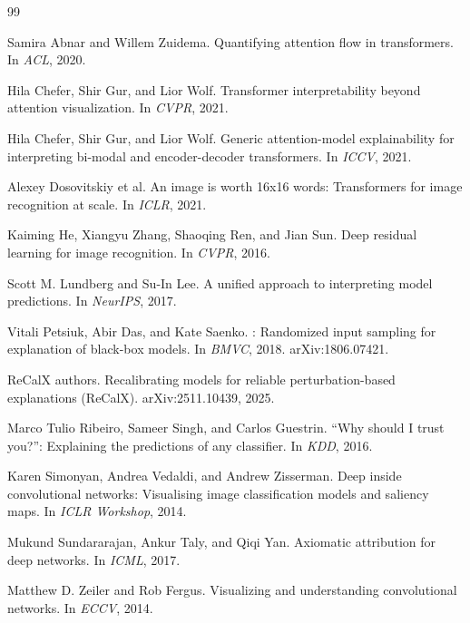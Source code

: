 \documentclass[11pt]{article}
\begin{document}

\begin{thebibliography}{99}
\setlength{\itemsep}{1pt}

Samira Abnar and Willem Zuidema.
\newblock Quantifying attention flow in transformers.
\newblock In \emph{ACL}, 2020.

Hila Chefer, Shir Gur, and Lior Wolf.
\newblock Transformer interpretability beyond attention visualization.
\newblock In \emph{CVPR}, 2021.

Hila Chefer, Shir Gur, and Lior Wolf.
\newblock Generic attention-model explainability for interpreting bi-modal and
encoder-decoder transformers.
\newblock In \emph{ICCV}, 2021.

Alexey Dosovitskiy et al.
\newblock An image is worth 16x16 words: Transformers for image recognition at
scale.
\newblock In \emph{ICLR}, 2021.

Kaiming He, Xiangyu Zhang, Shaoqing Ren, and Jian Sun.
\newblock Deep residual learning for image recognition.
\newblock In \emph{CVPR}, 2016.

Scott M. Lundberg and Su-In Lee.
\newblock A unified approach to interpreting model predictions.
\newblock In \emph{NeurIPS}, 2017.

Vitali Petsiuk, Abir Das, and Kate Saenko.
: Randomized input sampling for explanation of black-box models.
\newblock In \emph{BMVC}, 2018.
\newblock arXiv:1806.07421.

ReCalX authors.
\newblock Recalibrating models for reliable perturbation-based explanations
({ReCalX}).
\newblock arXiv:2511.10439, 2025.

Marco Tulio Ribeiro, Sameer Singh, and Carlos Guestrin.
\newblock ``Why should I trust you?'': Explaining the predictions of any
classifier.
\newblock In \emph{KDD}, 2016.

Karen Simonyan, Andrea Vedaldi, and Andrew Zisserman.
\newblock Deep inside convolutional networks: Visualising image classification
models and saliency maps.
\newblock In \emph{ICLR Workshop}, 2014.

Mukund Sundararajan, Ankur Taly, and Qiqi Yan.
\newblock Axiomatic attribution for deep networks.
\newblock In \emph{ICML}, 2017.

Matthew D. Zeiler and Rob Fergus.
\newblock Visualizing and understanding convolutional networks.
\newblock In \emph{ECCV}, 2014.

\end{thebibliography}
\end{document}

